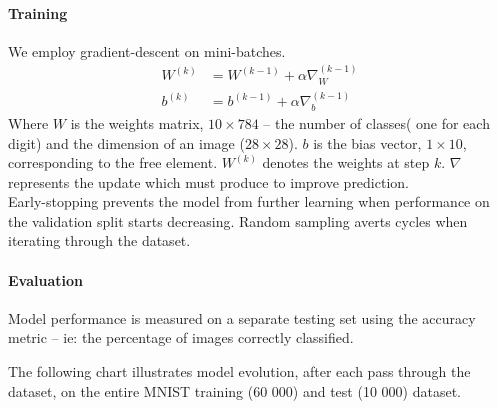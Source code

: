 \documentclass[a4paper]{article}
\begin{document}
\paragraph{Training} We employ gradient-descent on mini-batches. 
\begin{align*}
W^{(k)} &= W^{(k-1)} + \alpha \nabla_W^{(k-1)} \\ 
b^{(k)} &= b^{(k-1)} + \alpha \nabla_b^{(k-1)}
\end{align*}
Where $W$ is the weights matrix, $10 \times 784$ -- the number of classes( one for each digit) and the dimension of an image ($28 \times 28$). $b$ is the bias vector, $1 \times 10$, corresponding to the free element. $W^{(k)}$ denotes the weights at step $k$. $\nabla$ represents the update which must produce to improve prediction.
\\
Early-stopping prevents the model from further learning when performance on the validation split starts decreasing. Random sampling averts cycles when iterating through the dataset.

\paragraph{Evaluation}
Model performance is measured on a separate testing set using the accuracy metric -- ie: the percentage of images correctly classified.

\noindent The following chart illustrates model evolution, after each pass through the dataset, on the entire MNIST training (60 000) and test (10 000) dataset.
\end{document}

